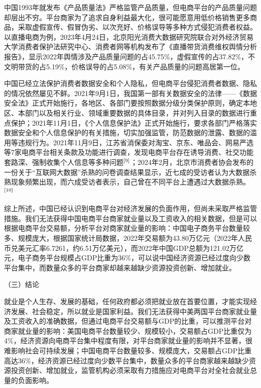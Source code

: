 \documentclass[12pt,twoside,utf8]{ctexart}
\begin{document}
中国1993年就发布《产品质量法》严格监管产品质量，但电商平台的产品质量问题却层出不穷。平台商家为了追求自身利益最大化，很可能愿意用低价格销售更多商品，采取虚假宣传、假冒伪劣、以次充好、价格误导等多种方式侵犯消费者权益。以直播电商为例，2023年4月24日，北京阳光消费大数据研究院联合对外经济贸易大学消费者保护法研究中心、消费者网等机构发布了《直播带货消费维权舆情分析报告》，显示2022年舆情涉及产品质量问题的占45.75\%，虚假宣传的占37.82\%，不文明带货的占5.19\%，价格误导的占5.08\%，有关产品质量的问题高居第一位。

中国已经立法保护消费者数据安全和个人隐私，但电商平台侵犯消费者数据、隐私的情况依然屡见不鲜。2021年9月1日，我国第一部有关数据安全的法律——《数据安全法》正式开始施行，各地区、各部门要按照数据分级分类保护原则，确定本地区、本部门以及相关行业、领域重要数据的具体目录，并对列入目录的数据进行重点保护；2021年11月1日，《个人信息保护法》正式开始施行，要求各部门严格落实数据安全和个人信息保护的有关措施，切实加强监管，防范数据的泄露、数据的滥用等违规行为。2021年11月9日，江苏省消保委对淘宝、京东、唯品会、网易严选等7家电商平台相关条款及功能进行调查，发现电商平台存在诱导消费、社交功能套路深、强制收集个人信息等多种问题$\textsuperscript{[9]}$；2024年2月，北京市消费者协会发布的一份关于“互联网大数据”杀熟的问卷调查结果显示，近七成的受访者认为大数据杀熟现象频繁出现，而六成受访者表示，自己曾在不同平台上遭遇过大数据杀熟。$\textsuperscript{[10]}$

综上所述，中国已经认识到电商平台对经济发展的负面作用，但尚未采取严格监管措施。我们无法获得中国电商平台商家就业量以及工资收入的相关数据，但是可以根据电商平台交易额，分析平台对商家就业量的影响：中国电子商务平台数量较多、规模庞大，根据国家统计局数据，2022年交易额为43.80万亿元（2022年人民币兑美元汇率6.7261，约6.51万亿美元），而2022年中国GDP总额为121.02万亿元，电子商务平台规模占GDP比重为36\%，可以说中国经济资源已经过度向少数平台集中，而数量众多的平台商家却越来越缺少资源投资创新、增加就业。

（三）结论

就业是个人生存、发展的基础，任何政府都必须把就业放在首要位置，才能实现经济发展、社会稳定，所以就业是国家利益。我们无法获得中美两国平台商家就业量及工资收入的准确数据，但通过电商平台交易额与GDP的比重，可以推测平台对商家就业量的影响：美国电商平台数量较少、规模较小，交易额占GDP比重仅为4\%，经济资源向电商平台集中程度有限，对平台商家就业量的影响并不显著，很难影响社会可持续发展；中国电商平台数量较多、规模庞大，交易额占GDP比重高达36\%，经济资源已经过度向少数平台集中，数量众多的平台商家越来越缺少资源投资创新、增加就业，监管机构必须采取有力措施应对电商平台对全社会就业总量的负面影响。
\end{document}
